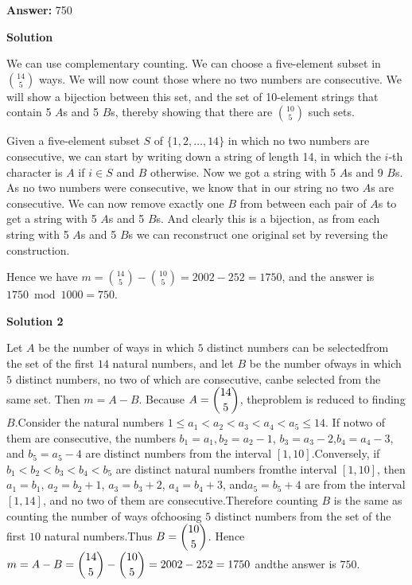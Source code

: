 \begin{enumerate}
 
 \textbf{Answer: }750



\textbf{Solution}

We can use complementary counting. We can choose a five-element subset in ${14\choose 5}$ ways. We will now count those where no two numbers are consecutive. We will show a bijection between this set, and the set of 10-element strings that contain 5 $A$s and 5 $B$s, thereby showing that there are ${10\choose 5}$ such sets.

 Given a five-element subset $S$ of $\{1,2,\dots,14\}$ in which no two numbers are consecutive, we can start by writing down a string of length 14, in which the $i$-th character is $A$ if $i\in S$ and $B$ otherwise. Now we got a string with 5 $A$s and 9 $B$s. As no two numbers were consecutive, we know that in our string no two $A$s are consecutive. We can now remove exactly one $B$ from between each pair of $A$s to get a string with 5 $A$s and 5 $B$s. And clearly this is a bijection, as from each string with 5 $A$s and 5 $B$s we can reconstruct one original set by reversing the construction.

 Hence we have $m = {14\choose 5} - {10\choose 5} = 2002 - 252 = 1750$, and the answer is $1750 \bmod 1000 = \boxed{750}$.

 



\textbf{Solution 2}

Let $A$ be the number of ways in which $5$ distinct numbers can be selectedfrom the set of the first $14$ natural numbers, and let $B$ be the number ofways in which $5$ distinct numbers, no two of which are consecutive, canbe selected from the same set. Then $m = A -B$. Because $A = \dbinom{14}{5}$, theproblem is reduced to finding $B$.Consider the natural numbers $1 \leq a_1 < a_2 < a_3 < a_4 < a_5 \leq 14$. If notwo of them are consecutive, the numbers $b_1 = a_1, b_2 = a_2 - 1$, $b_3 = a_3 - 2$,$b_4 = a_4 - 3$, and $b_5 = a_5 - 4$ are distinct numbers from the interval $[1, 10]$.Conversely, if $b_1 < b_2 < b_3 < b_4 < b_5$ are distinct natural numbers fromthe interval $[1, 10]$, then $a_1 = b_1$, $a_2 = b_2 + 1$, $a_3 = b_3 + 2$, $a_4 = b_4 + 3$, and$a_5 = b_5 + 4$ are from the interval $[1, 14]$, and no two of them are consecutive.Therefore counting $B$ is the same as counting the number of ways ofchoosing $5$ distinct numbers from the set of the first $10$ natural numbers.Thus $B = \dbinom{10}{5}$. Hence $m = A - B = \dbinom{14}{5} - \dbinom{10}{5} = 2002 - 252 = 1750$ andthe answer is $750$.


\end{enumerate}
